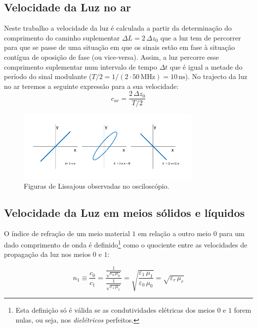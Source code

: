 \documentclass[a4paper,12pt]{article}      %
\begin{document}
\subsection{\sf Velocidade da Luz no ar}
Neste trabalho a
velocidade da luz é calculada a partir da determinação do comprimento do
caminho suplementar $\Delta L= 2\,\Delta z_0$ que a luz tem de percorrer para que se passe de uma
situação em que os sinais estão em fase à situação contígua de
 oposição de fase (ou vice-versa). Assim, a luz percorre esse comprimento suplementar num intervalo de tempo $\Delta t$ que é igual a metade do período do sinal modulante ($T/2=1/(2\cdot50\,\textrm{MHz})= 10\,\textrm{ns}$). 
No trajecto da luz no ar teremos a seguinte expressão para a sua velocidade:
\begin{equation}
	\label{eq:vc}
	c_{ar} = \frac{2\,\Delta z_0}{T/2} 
\end{equation}


\begin{figure}
	[htb]  \centering 
	\includegraphics[width=0.8\textwidth]{osci_fase}
	\caption{Figuras de Lissajous observadas no osciloscópio. \label{fig:fase}} 
\end{figure}


\subsection{\sf Velocidade da Luz em meios sólidos e líquidos}
 O índice de refração de um meio material $1$ em relação a outro meio $0$
 para um dado comprimento de onda é definido\footnote{Esta definição só é válida se as condutividades elétricas dos meios $0$ e $1$ forem nulas, ou seja, nos \emph{dielétricos} perfeitos.}
 como o quociente entre as velocidades de propagação da luz nos meios $0$ e $1$:

 \begin{equation}
	\label{eq:index}
	n_1 \equiv \frac{c_0}{c_1}  = \frac{\frac{1}{\sqrt{\varepsilon_0 \, \mu_0}} }{\frac{1}{\sqrt{\varepsilon_1 \, \mu_1}} } =
		\sqrt{\frac{\varepsilon_1 \, \mu_1}{\varepsilon_0 \, \mu_0}} = \sqrt{\varepsilon_r \, \mu_r}
\end{equation}
\end{document}
